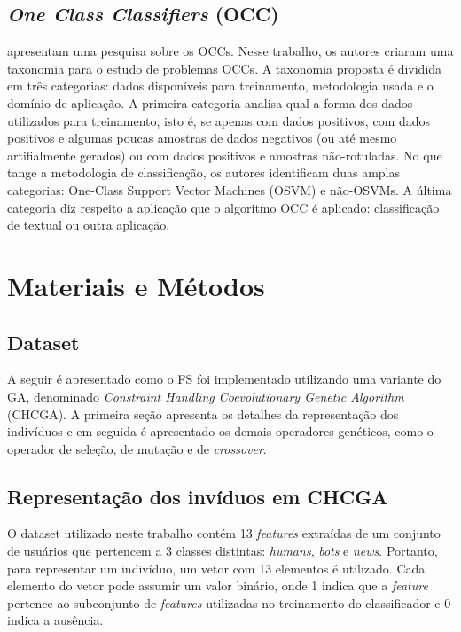 \documentclass{article}
\begin{document}
\subsection{{\itshape One Class Classifiers} (OCC)}
\citet{Khan2014} apresentam uma pesquisa sobre os OCCs. Nesse trabalho, os
autores criaram uma taxonomia para o estudo de problemas OCCs. A taxonomia
proposta é dividida em três categorias: dados disponíveis para treinamento,
metodologia usada e o domínio de aplicação. A primeira categoria analisa qual a
forma dos dados utilizados para treinamento, isto é, se apenas com dados
positivos, com dados positivos e algumas poucas amostras de dados negativos (ou
até mesmo artifialmente gerados) ou com dados positivos e amostras
não-rotuladas. No que tange a metodologia de classificação, os autores
identificam duas amplas categorias: One-Class Support Vector Machines (OSVM) e
não-OSVMs. A última categoria diz respeito a aplicação que o algoritmo OCC é
aplicado: classificação de textual ou outra aplicação.

\section{Materiais e Métodos} \label{sec_metodo}
\subsection{Dataset}

A seguir é apresentado como o FS foi implementado utilizando uma variante do GA,
denominado \textit{Constraint Handling Coevolutionary Genetic Algorithm}
(CHCGA). A primeira seção apresenta os detalhes da representação dos indivíduos
e em seguida é apresentado os demais operadores genéticos, como o operador de
seleção, de mutação e de \textit{crossover}.

\subsection{Representação dos invíduos em CHCGA}
O dataset utilizado neste trabalho contém 13 \textit{features} extraídas de um
conjunto de usuários que pertencem a 3 classes distintas: \textit{humans},
\textit{bots} e \textit{news}. Portanto, para representar um indivíduo, um vetor
com 13 elementos é utilizado. Cada elemento do vetor pode assumir um valor
binário, onde 1 indica que a \textit{feature} pertence ao subconjunto de
\textit{features} utilizadas no treinamento do classificador e 0 indica a
ausência.
\end{document}
